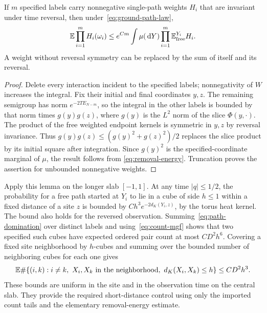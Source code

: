 \begin{lemma}\label{lem:path-domination}
If $m$ specified labels carry nonnegative single-path weights $H_i$ that
are invariant under time reversal, then under~\eqref{eq:ground-path-law},
\begin{equation}\label{eq:path-domination}
 \mathbb E\prod_{i=1}^m H_i(\omega_i)
 \le e^{Cm}\int\mu(\,\mathrm d Y)
                  \prod_{i=1}^m\mathbb E^{Y_i}_{\mathrm{free}}H_i.
\end{equation}
A weight without reversal symmetry can be replaced by the sum of itself
and its reversal.
\end{lemma}
\begin{proof}
Delete every interaction incident to the specified labels; nonnegativity
of $W$ increases the integral. Fix their initial and final coordinates
$y,z$. The remaining semigroup has norm $e^{-2TE_{N-m}}$, so the integral
in the other labels is bounded by that norm times $g(y)g(z)$, where
$g(y)$ is the $L^2$ norm of the slice $\Phi(y,\cdot)$. The product of
the free weighted endpoint kernels is symmetric in $y,z$ by reversal
invariance. Thus $g(y)g(z)\le(g(y)^2+g(z)^2)/2$ replaces the slice
product by its initial square after integration. Since $g(y)^2$ is the
specified-coordinate marginal of $\mu$, the result follows from
\eqref{eq:removal-energy}. Truncation proves the assertion for unbounded
nonnegative weights.
\end{proof}

Apply this lemma on the longer slab $[-1,1]$. At any time $|q|\le1/2$,
the probability for a free path started at $Y_i$ to lie in a cube of
side $h\le1$ within a fixed distance of a site $z$ is bounded by
$Ch^3e^{-2d_K(Y_i,z)}$, by the torus heat kernel. The bound also holds
for the reversed observation. Summing~\eqref{eq:path-domination} over
distinct labels and using~\eqref{eq:count-mgf} shows that two specified
such cubes have expected ordered pair count at most $CD^2h^6$.
Covering a fixed site neighborhood by $h$-cubes and summing over the
bounded number of neighboring cubes for each one gives
\begin{equation}\label{eq:pair-bound}
 \mathbb E\#\{(i,k):i\ne k,\ X_i,X_k\text{ in the neighborhood},\
                    d_K(X_i,X_k)\le h\}\le CD^2h^3.
\end{equation}
These bounds are uniform in the site and in the observation time on the
central slab. They provide the required short-distance control using only
the imported count tails and the elementary removal-energy estimate.
